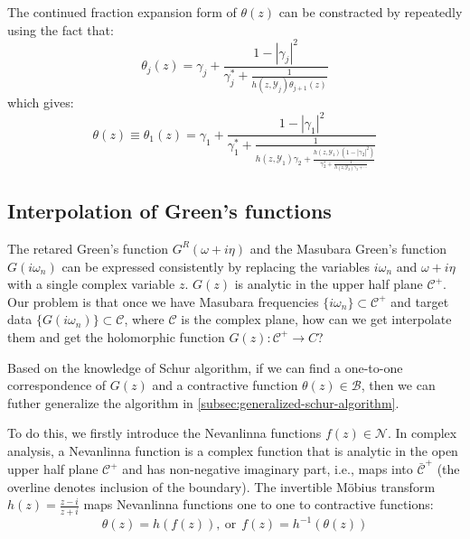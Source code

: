 \documentclass[
	preprint,%
	aps,
	prb,
	showpacs,	
	amsmath, amssymb]{revtex4-2}
\newcommand{\Y}{ {\mathcal{Y}} }
\newcommand{\C}{ {\mathcal{C}} }
\newcommand{\Cbar}{ {\bar{\mathcal{C}}} }
\newcommand{\B}{ {\mathcal{B}} }
\newcommand{\N}{ {\mathcal{N}} }
\begin{document}
The continued fraction 
expansion form of $\theta(z)$ can be constracted by 
repeatedly using the fact that:
\begin{equation}\label{eq:inv-theta-recursion-frac}
	\theta_{j}(z) = \gamma_j + \frac{1 - |\gamma_j|^2}
		{\gamma_j^* + \frac{1}{h(z,\Y_j) \theta_{j+1}(z)}}
\end{equation}
which gives:
\begin{equation}\label{eq:theta-fraction-expansion-fit}
	\theta(z) \equiv \theta_1(z) = \gamma_1 + \frac{1 - |\gamma_1|^2}
		{\gamma_1^* + \frac{1}
		{h(z,\Y_1)\gamma_2 + \frac{h(z,\Y_1) (1 - |\gamma_2|^2)}
		{\gamma_2^* + \frac{1}{h(z,\Y_2) \gamma_3 + \cdots}}
		}
		}
\end{equation}

\subsection{Interpolation of Green's functions}
\label{subsec:interpolation-of-GF}

The retared Green's function $G^R(\omega + i\eta)$ and the Masubara 
Green's function $G(i\omega_n)$ can be expressed consistently by replacing 
the variables $i\omega_n$ and $\omega + i\eta$ with a single complex 
variable $z$. $G(z)$ is analytic in the upper half plane $\C^+$. 
Our problem is that once we have Masubara frequencies 
$\{i\omega_n\} \subset \C^+$ 
and target data $\{ G(i\omega_n)\} \subset  \C$, where $\C$ is 
the complex plane, how can we get interpolate them and get the 
holomorphic function $G(z):\C^+ \to C$?

Based on the knowledge of Schur algorithm, if we can find 
a one-to-one correspondence of $G(z)$ and a contractive 
function $\theta(z) \in \B$, then we can futher generalize 
the algorithm in \cref{subsec:generalized-schur-algorithm}.

To do this, we firstly introduce the Nevanlinna functions $f(z) \in \N$.
In complex analysis, a Nevanlinna function is a complex
function that is analytic in the open upper half plane $\C^+$ and
has non-negative imaginary part, i.e., maps into $\Cbar^+$ (the
overline denotes inclusion of the boundary).
The invertible Möbius transform $h(z) = \frac{z-i}{z+i}$ 
maps Nevanlinna functions one to one to contractive
functions:
\begin{equation}\label{eq:f-theta-relation}
	\theta(z) = h(f(z)),\ \mathrm{or} \ \
	f(z) = h^{-1}(\theta(z))
\end{equation}
\end{document}
